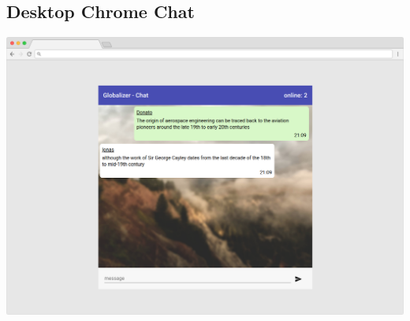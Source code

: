 \documentclass[12pt]{article}
\begin{document}
        \subsection{Desktop Chrome Chat}
        \includegraphics[width=\textwidth]{frame-desktop-chat.png}
\end{document}
